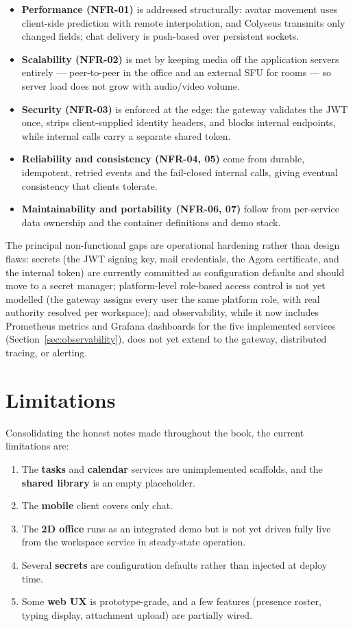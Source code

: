 \begin{itemize}
  \item \textbf{Performance (NFR-01)} is addressed structurally: avatar movement
  uses client-side prediction with remote interpolation, and Colyseus transmits
  only changed fields; chat delivery is push-based over persistent sockets.
  \item \textbf{Scalability (NFR-02)} is met by keeping media off the application
  servers entirely --- peer-to-peer in the office and an external SFU for rooms ---
  so server load does not grow with audio/video volume.
  \item \textbf{Security (NFR-03)} is enforced at the edge: the gateway validates
  the JWT once, strips client-supplied identity headers, and blocks internal
  endpoints, while internal calls carry a separate shared token.
  \item \textbf{Reliability and consistency (NFR-04, 05)} come from durable,
  idempotent, retried events and the fail-closed internal calls, giving eventual
  consistency that clients tolerate.
  \item \textbf{Maintainability and portability (NFR-06, 07)} follow from
  per-service data ownership and the container definitions and demo stack.
\end{itemize}

The principal non-functional gaps are operational hardening rather than design
flaws: secrets (the JWT signing key, mail credentials, the Agora certificate, and
the internal token) are currently committed as configuration defaults and should
move to a secret manager; platform-level role-based access control is not yet
modelled (the gateway assigns every user the same platform role, with real
authority resolved per workspace); and observability, while it now includes
Prometheus metrics and Grafana dashboards for the five implemented services
(Section~\ref{sec:observability}), does not yet extend to the gateway,
distributed tracing, or alerting.

\section{Limitations}

Consolidating the honest notes made throughout the book, the current limitations
are:

\begin{enumerate}
  \item The \textbf{tasks} and \textbf{calendar} services are unimplemented
  scaffolds, and the \textbf{shared library} is an empty placeholder.
  \item The \textbf{mobile} client covers only chat.
  \item The \textbf{2D office} runs as an integrated demo but is not yet driven
  fully live from the workspace service in steady-state operation.
  \item Several \textbf{secrets} are configuration defaults rather than injected
  at deploy time.
  \item Some \textbf{web UX} is prototype-grade, and a few features (presence
  roster, typing display, attachment upload) are partially wired.
\end{enumerate}

